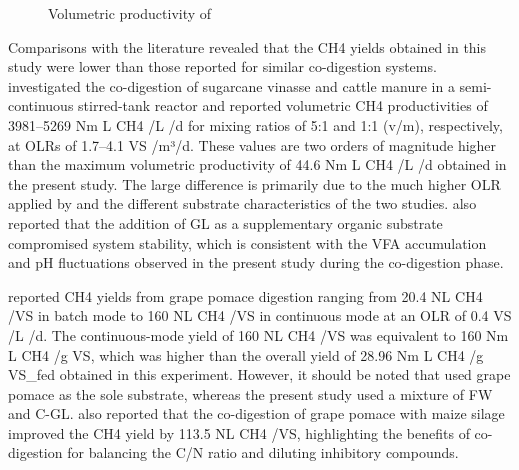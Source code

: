 \documentclass[12pt, a4paper, oneside]{report}
\begin{document}
\begin{figure}[H]
    \caption{Volumetric productivity of }
    
\end{figure}

\endgroup

Comparisons with the literature revealed that the CH4 yields obtained in this study were lower than those reported for similar co-digestion systems. \textcite{aguiar2026} investigated the co-digestion of sugarcane vinasse and cattle manure in a semi-continuous stirred-tank reactor and reported volumetric CH4 productivities of 3981–5269 Nm L CH4 /L /d for mixing ratios of 5:1 and 1:1 (v/m), respectively, at OLRs of 1.7–4.1 \kg VS /m³/d. These values are two orders of magnitude higher than the maximum volumetric productivity of 44.6 Nm L CH4 /L /d obtained in the present study. The large difference is primarily due to the much higher OLR applied by \textcite{aguiar2026} and the different substrate characteristics of the two studies. \textcite{aguiar2026} also reported that the addition of GL as a supplementary organic substrate compromised system stability, which is consistent with the VFA accumulation and pH fluctuations observed in the present study during the co-digestion phase.

\textcite{longanesi2016} reported CH4 yields from grape pomace digestion ranging from 20.4 NL CH4 /\kg VS in batch mode to 160 NL CH4 /\kg VS in continuous mode at an OLR of 0.4 \g VS /L /d. The continuous-mode yield of 160 NL CH4 /\kg VS was equivalent to 160 Nm L CH4 /g VS, which was higher than the overall yield of 28.96 Nm L CH4 /g VS_fed obtained in this experiment. However, it should be noted that \textcite{longanesi2016} used grape pomace as the sole substrate, whereas the present study used a mixture of FW and C-GL. \textcite{longanesi2016} also reported that the co-digestion of grape pomace with maize silage improved the CH4 yield by 113.5 NL CH4 /\kg VS, highlighting the benefits of co-digestion for balancing the C/N ratio and diluting inhibitory compounds.
\end{document}
